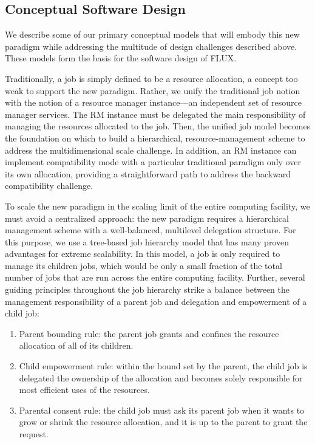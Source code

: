 \subsection{Conceptual Software Design}
We describe some of our primary conceptual models
that will embody this new paradigm while addressing
the multitude of design challenges described above.
These models form the basis for the software design
of FLUX.

\vspace{1ex}
 Traditionally, a job is
simply defined to be a resource allocation, a concept
too weak to support the new paradigm. Rather, we unify
the traditional job notion with the notion of a resource
manager instance---an independent set of resource
manager services. The RM instance must be delegated
the main responsibility of managing the resources allocated
to the job. Then, the unified job model becomes
the foundation on which to build a hierarchical, 
resource-management scheme to address the multidimensional
scale challenge. In addition, an RM instance can
implement compatibility mode with a particular
traditional paradigm only over its own allocation, 
providing a straightforward path to address
the backward compatibility challenge.

\vspace{1ex}
 To scale the new paradigm
in the scaling limit of the entire computing facility, 
we must avoid a centralized approach: the new paradigm 
requires a hierarchical management scheme with a well-balanced, 
multilevel delegation structure. For this purpose, 
we use a tree-based job hierarchy model that has 
many proven advantages for extreme scalability. 
In this model, a job is only required to manage 
its children jobs, which would be only a small fraction 
of the total number of jobs that are run across 
the entire computing facility. Further, several guiding 
principles throughout the job hierarchy strike 
a balance between the management responsibility 
of a parent job and delegation and empowerment 
of a child job:

\begin{enumerate}
\item{Parent bounding rule: the parent job grants 
and confines the resource allocation of all of its children.}

\item{Child empowerment rule: within the bound set 
by the parent, the child job is delegated the ownership 
of the allocation and becomes solely responsible 
for most efficient uses of the resources.}

\item{Parental consent rule: the child job must ask 
its parent job when it wants to grow or shrink the resource 
allocation, and it is up to the parent to grant the request.}
\end{enumerate}

